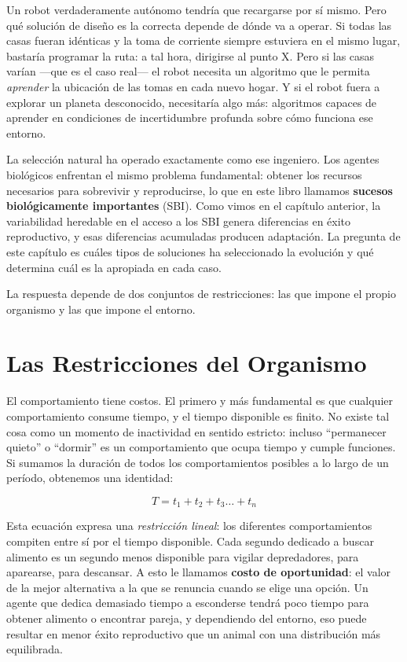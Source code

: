 \documentclass[
  letterpaper,
  DIV=11,
  numbers=noendperiod]{scrreprt}
\begin{document}
Un robot verdaderamente autónomo tendría que recargarse por sí mismo.
Pero qué solución de diseño es la correcta depende de dónde va a operar.
Si todas las casas fueran idénticas y la toma de corriente siempre
estuviera en el mismo lugar, bastaría programar la ruta: a tal hora,
dirigirse al punto X. Pero si las casas varían ---que es el caso real---
el robot necesita un algoritmo que le permita \emph{aprender} la
ubicación de las tomas en cada nuevo hogar. Y si el robot fuera a
explorar un planeta desconocido, necesitaría algo más: algoritmos
capaces de aprender en condiciones de incertidumbre profunda sobre cómo
funciona ese entorno.

La selección natural ha operado exactamente como ese ingeniero. Los
agentes biológicos enfrentan el mismo problema fundamental: obtener los
recursos necesarios para sobrevivir y reproducirse, lo que en este libro
llamamos \textbf{sucesos biológicamente importantes} (SBI). Como vimos
en el capítulo anterior, la variabilidad heredable en el acceso a los
SBI genera diferencias en éxito reproductivo, y esas diferencias
acumuladas producen adaptación. La pregunta de este capítulo es cuáles
tipos de soluciones ha seleccionado la evolución y qué determina cuál es
la apropiada en cada caso.

La respuesta depende de dos conjuntos de restricciones: las que impone
el propio organismo y las que impone el entorno.

\section{Las Restricciones del
Organismo}\label{las-restricciones-del-organismo}

El comportamiento tiene costos. El primero y más fundamental es que
cualquier comportamiento consume tiempo, y el tiempo disponible es
finito. No existe tal cosa como un momento de inactividad en sentido
estricto: incluso ``permanecer quieto'' o ``dormir'' es un
comportamiento que ocupa tiempo y cumple funciones. Si sumamos la
duración de todos los comportamientos posibles a lo largo de un período,
obtenemos una identidad:

\[T = t_1 + t_2 + t_3 \dots + t_n\]

Esta ecuación expresa una \emph{restricción lineal}: los diferentes
comportamientos compiten entre sí por el tiempo disponible. Cada segundo
dedicado a buscar alimento es un segundo menos disponible para vigilar
depredadores, para aparearse, para descansar. A esto le llamamos
\textbf{costo de oportunidad}: el valor de la mejor alternativa a la que
se renuncia cuando se elige una opción. Un agente que dedica demasiado
tiempo a esconderse tendrá poco tiempo para obtener alimento o encontrar
pareja, y dependiendo del entorno, eso puede resultar en menor éxito
reproductivo que un animal con una distribución más equilibrada.
\end{document}
